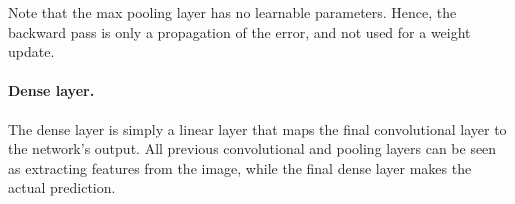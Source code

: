 Note that the max pooling layer has no learnable parameters. Hence, the backward pass is only a
propagation of the error, and not used for a weight update.

\paragraph{Dense layer.}

The dense layer is simply a linear layer that maps the final convolutional layer to the network's
output. All previous convolutional and pooling layers can be seen as extracting features from the
image, while the final dense layer makes the actual prediction.

